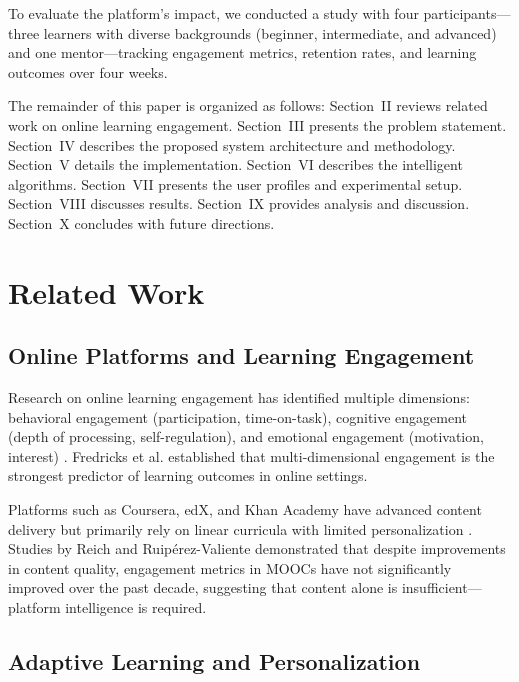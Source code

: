 \documentclass[conference]{IEEEtran}
\begin{document}
To evaluate the platform's impact, we conducted a study with four participants---three learners with diverse backgrounds (beginner, intermediate, and advanced) and one mentor---tracking engagement metrics, retention rates, and learning outcomes over four weeks.

The remainder of this paper is organized as follows: Section~II reviews related work on online learning engagement. Section~III presents the problem statement. Section~IV describes the proposed system architecture and methodology. Section~V details the implementation. Section~VI describes the intelligent algorithms. Section~VII presents the user profiles and experimental setup. Section~VIII discusses results. Section~IX provides analysis and discussion. Section~X concludes with future directions.

\section{Related Work}

\subsection{Online Platforms and Learning Engagement}

Research on online learning engagement has identified multiple dimensions: behavioral engagement (participation, time-on-task), cognitive engagement (depth of processing, self-regulation), and emotional engagement (motivation, interest) \cite{b6}. Fredricks et al. \cite{b7} established that multi-dimensional engagement is the strongest predictor of learning outcomes in online settings.

Platforms such as Coursera, edX, and Khan Academy have advanced content delivery but primarily rely on linear curricula with limited personalization \cite{b8}. Studies by Reich and Ruipérez-Valiente \cite{b3} demonstrated that despite improvements in content quality, engagement metrics in MOOCs have not significantly improved over the past decade, suggesting that content alone is insufficient---platform intelligence is required.

\subsection{Adaptive Learning and Personalization}
\end{document}
